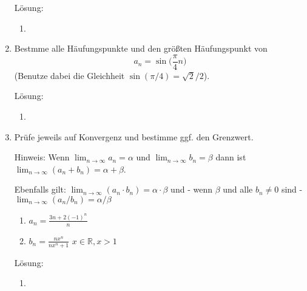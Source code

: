 \documentclass[../main.tex]{subfiles}
\begin{document}
\begin{enumerate}
          Lösung:
          \begin{enumerate}
              \item 
          \end{enumerate}
	\item Bestmme alle Häufungspunkte und den größten Häufungspunkt von
	      \[ a_n = \sin \Big( \frac{\pi}{4}n \Big) \]
	      (Benutze dabei die Gleichheit \( \sin( \pi / 4 ) = \sqrt{2} / 2 \)).
          
          Lösung:
          \begin{enumerate}
              \item 
          \end{enumerate}
	\item Prüfe jeweils auf Konvergenz und bestimme ggf. den Grenzwert.

	      Hinweis: Wenn \( \lim_{n \to \infty} a_n = \alpha \) und
	      \( \lim_{n \to \infty} b_n = \beta \) dann ist
	      \( \lim_{n \to \infty} (a_n + b_n) = \alpha + \beta \).

	      Ebenfalls gilt: \( \lim_{n \to \infty} (a_n \cdot b_n) = \alpha \cdot \beta \) und
	      - wenn \( \beta \)  und alle \( b_n \neq 0 \) sind -
	      \( \lim_{n \to \infty }(a_n / b_n) = \alpha / \beta \)
	      \begin{enumerate}
		      \item \( a_n = \frac{ 3n +2(-1)^n }{ n } \)
		      \item \( b_n = \frac{ nx^n }{ nx^n + 1 } \)
		            \( x \in \mathbb{R}, x > 1 \)
	      \end{enumerate}
          
          Lösung:
          \begin{enumerate}
              \item 
          \end{enumerate}
\end{enumerate}
\end{document}
